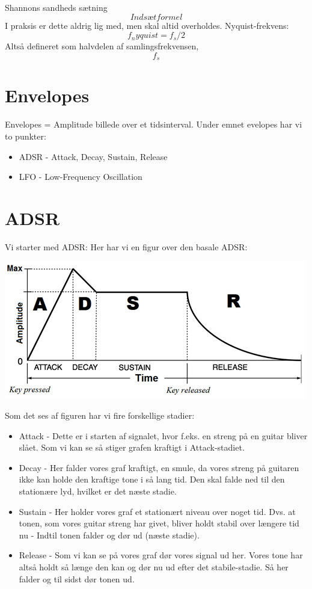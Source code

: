 \documentclass[12pt, letterpaper]{article}
\begin{document}
Shannons sandheds sætning
$$Indsæt formel$$
I praksis er dette aldrig lig med, men skal altid overholdes. 
Nyquist-frekvens:
$$f_nyquist = f_s/2$$
Altså defineret som halvdelen af samlingsfrekvensen, $$f_s$$

\section*{Envelopes}

Envelopes = Amplitude billede over et tidsinterval. 
Under emnet evelopes har vi to punkter: 
\begin{itemize}
\item ADSR - Attack, Decay, Sustain, Release
\item LFO - Low-Frequency Oscillation
\end{itemize}

\section*{ADSR}
Vi starter med ADSR: 
Her har vi en figur over den basale ADSR: 

\begin{center}
\includegraphics[width=\textwidth]{billeder/ADSR}
\end{center}

Som det ses af figuren har vi fire forskellige stadier: 
\begin{itemize}
\item Attack - Dette er i starten af signalet, hvor f.eks. en streng på en guitar bliver slået. Som vi kan se så stiger grafen kraftigt i Attack-stadiet. 
\item Decay - Her falder vores graf kraftigt, en smule, da vores streng på guitaren ikke kan holde den kraftige tone i så lang tid. Den skal falde ned til den stationære lyd, hvilket er det næste stadie.  
\item Sustain - Her holder vores graf et stationært niveau over noget tid. Dvs. at tonen, som vores guitar streng har givet, bliver holdt stabil over længere tid nu - Indtil tonen falder og dør ud (næste stadie). 
\item Release - Som vi kan se på vores graf dør vores signal ud her. Vores tone har altså holdt så længe den kan og dør nu ud efter det stabile-stadie. Så her falder og til sidst dør tonen ud. 
\end{itemize}
\end{document}
